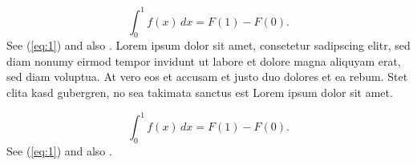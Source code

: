 \documentclass{article}
\begin{document}
\begin{equation}\label{eq:1}
\int_0^1 f(x) \,dx = F(1)-F(0). 
\end{equation}
See (\ref{eq:1}) and also \cite{book}.
Lorem ipsum dolor sit amet, consetetur sadipscing elitr, sed diam nonumy eirmod
tempor invidunt ut labore et dolore magna aliquyam erat, sed diam voluptua. At
vero eos et accusam et justo duo dolores et ea rebum. Stet clita kasd
gubergren, no sea takimata sanctus est Lorem ipsum dolor sit amet.

\begin{equation}\label{eq:1}
\int_0^1 f(x) \,dx = F(1)-F(0). 
\end{equation}
See (\ref{eq:1}) and also \cite{book}.

\printbibliography 
\end{document}
